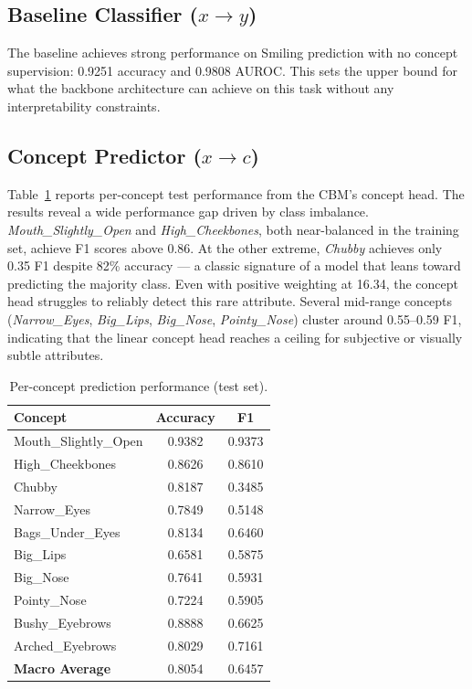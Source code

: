 \documentclass[11pt,a4paper]{article}
\begin{document}
\subsection{Baseline Classifier ($x \to y$)}

The baseline achieves strong performance on Smiling prediction with no concept supervision: 0.9251 accuracy and 0.9808 AUROC. This sets the upper bound for what the backbone architecture can achieve on this task without any interpretability constraints.


\subsection{Concept Predictor ($x \to c$)}

Table~\ref{tab:concepts} reports per-concept test performance from the CBM's concept head. The results reveal a wide performance gap driven by class imbalance. \emph{Mouth\_Slightly\_Open} and \emph{High\_Cheekbones}, both near-balanced in the training set, achieve F1 scores above 0.86. At the other extreme, \emph{Chubby} achieves only 0.35 F1 despite 82\% accuracy --- a classic signature of a model that leans toward predicting the majority class. Even with positive weighting at 16.34, the concept head struggles to reliably detect this rare attribute. Several mid-range concepts (\emph{Narrow\_Eyes}, \emph{Big\_Lips}, \emph{Big\_Nose}, \emph{Pointy\_Nose}) cluster around 0.55--0.59 F1, indicating that the linear concept head reaches a ceiling for subjective or visually subtle attributes.

\begin{table}[H]
\centering
\caption{Per-concept prediction performance (test set).}
\label{tab:concepts}
\begin{tabular}{lcc}
\toprule
\textbf{Concept} & \textbf{Accuracy} & \textbf{F1} \\
\midrule
Mouth\_Slightly\_Open  & 0.9382 & 0.9373 \\
High\_Cheekbones       & 0.8626 & 0.8610 \\
Chubby                 & 0.8187 & 0.3485 \\
Narrow\_Eyes            & 0.7849 & 0.5148 \\
Bags\_Under\_Eyes       & 0.8134 & 0.6460 \\
Big\_Lips              & 0.6581 & 0.5875 \\
Big\_Nose              & 0.7641 & 0.5931 \\
Pointy\_Nose           & 0.7224 & 0.5905 \\
Bushy\_Eyebrows        & 0.8888 & 0.6625 \\
Arched\_Eyebrows       & 0.8029 & 0.7161 \\
\midrule
\textbf{Macro Average} & 0.8054 & 0.6457 \\
\bottomrule
\end{tabular}
\end{table}
\end{document}
